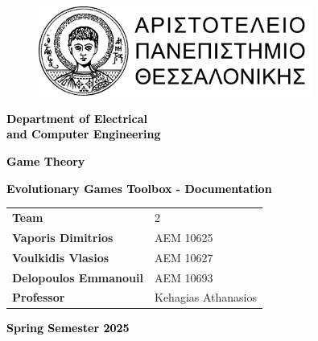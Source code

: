 \documentclass[12pt]{article}
\begin{document}
\begin{titlepage}
\centering
\begin{figure}[H]
\centering
\includegraphics[width=0.8\textwidth]{banner-horizontal-black300ppi.png}\par %
\end{figure}
\vspace{18pt}
\textcolor{black}{\Large \bfseries Department of Electrical\\and Computer Engineering\\}\par
\vspace{1cm}
\vfill
\textcolor{black}{\Large \bfseries Game Theory}\par
\vspace{12pt}
\textcolor{black}{\large \bfseries Evolutionary Games Toolbox - Documentation}\par

\vspace{0.5cm} %
\vfill
{}%
%
{\large
\def\arraystretch{1.3}
\begin{tabularx}{\textwidth}{ R|L }
\textbf{Team}                			 & 2           \\
\textbf{Vaporis Dimitrios}      & ΑΕΜ 10625 \\
\textbf{Voulkidis Vlasios}        & ΑΕΜ 10627 \\
\textbf{Delopoulos Emmanouil}      & ΑΕΜ 10693 \\
\textbf{Professor}           & Kehagias Athanasios\\
\end{tabularx}
}
\vspace{0.5cm}
\vfill
\textcolor{black}{\large \bfseries Spring Semester 2025}\par
\end{titlepage}
\restoregeometry

\tableofcontents %

\end{document}

